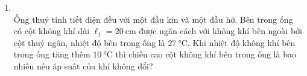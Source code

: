 \begin{enumerate}[label=\bfseries Câu \arabic*:, leftmargin=1.7cm]
\item {}\\
Ống thuỷ tinh tiết diện đều với một đầu kín và một đầu hở. Bên trong ống có cột không khí dài $\ell_1=\SI{20}{\centi\meter}$ được ngăn cách với không khí bên ngoài bởi cột thuỷ ngân, nhiệt độ bên trong ống là $\SI{27}{\celsius}$. Khi nhiệt độ không khí bên trong ống tăng thêm $\SI{10}{\celsius}$ thì chiều cao cột không khí bên trong ống là bao nhiêu nếu áp suất của khí không đổi?


\end{enumerate}
